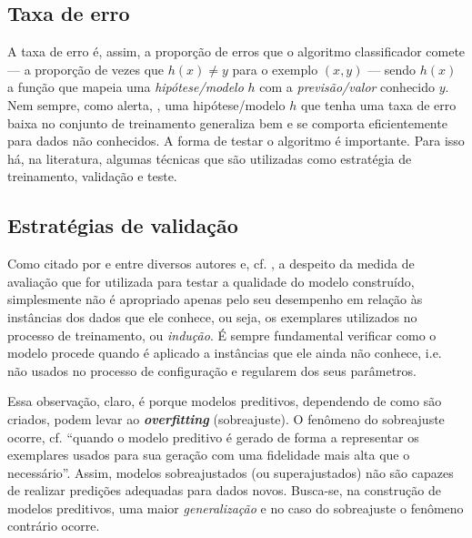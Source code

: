 \subsection{Taxa de erro}\label{taxa_erro}
A taxa de erro é, assim, a proporção de erros que o algoritmo classificador comete --- a proporção de vezes que $h(x)\neq y$ para o exemplo $(x,y)$ --- sendo $h(x)$ a função que mapeia uma \textit{hipótese/modelo} $h$ com a \textit{previsão/valor} conhecido $y$. Nem sempre, como alerta, , uma hipótese/modelo $h$ que tenha uma taxa de erro baixa no conjunto de treinamento generaliza bem e se comporta eficientemente para dados não conhecidos. A forma de testar o algoritmo é importante. Para isso há, na literatura, algumas técnicas que são utilizadas como estratégia de treinamento, validação e teste.

\subsection{Estratégias de validação}\label{estrategias_validacao}
Como citado por  e  entre diversos autores e, cf. , a despeito da medida de avaliação que for utilizada para testar a qualidade do modelo construído, simplesmente não é apropriado apenas pelo seu desempenho em relação às instâncias dos dados que ele conhece, ou seja, os exemplares utilizados no processo de treinamento, ou \textit{indução}. É sempre fundamental verificar como o modelo procede quando é aplicado a instâncias que ele ainda não conhece, i.e. não usados no processo de configuração e regularem dos seus parâmetros.

Essa observação, claro, é porque modelos preditivos, dependendo de como são criados, podem levar ao \textit{\textbf{overfitting}} (sobreajuste). O fenômeno do sobreajuste ocorre, cf.  ``quando o modelo preditivo é gerado de forma a representar os exemplares usados para sua geração com uma fidelidade mais alta que o necessário''. Assim, modelos sobreajustados (ou superajustados) não são capazes de realizar predições adequadas para dados novos. Busca-se, na construção de modelos preditivos, uma maior \textit{generalização} e no caso do sobreajuste o fenômeno contrário ocorre. 

